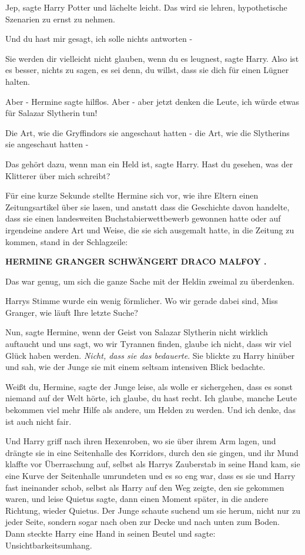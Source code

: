 \glqq{}Jep\grqq{}, sagte Harry Potter und lächelte leicht. \glqq{}Das wird sie
lehren, hypothetische Szenarien zu ernst zu nehmen.\grqq{}

\glqq{}Und du hast mir gesagt, ich solle nichts antworten -\grqq{}

\glqq{}Sie werden dir vielleicht nicht glauben, wenn du es leugnest\grqq{}, sagte
Harry. \glqq{}Also ist es besser, nichts zu sagen, es sei denn, du willst, dass
sie dich für einen Lügner halten.\grqq{}

\glqq{}Aber -\grqq{} Hermine sagte hilflos. \glqq{}Aber - aber jetzt denken die
Leute, ich würde etwas für Salazar Slytherin tun!\grqq{}

Die Art, wie die Gryffindors sie angeschaut hatten - die Art, wie die Slytherins
sie angeschaut hatten -

\glqq{}Das gehört dazu, wenn man ein Held ist\grqq{}, sagte Harry. \glqq{}Hast du
gesehen, was der Klitterer über mich schreibt?\grqq{}

Für eine kurze Sekunde stellte Hermine sich vor, wie ihre Eltern einen
Zeitungsartikel über sie lasen, und anstatt dass die Geschichte davon handelte,
dass sie einen landesweiten Buchstabierwettbewerb gewonnen hatte oder auf
irgendeine andere Art und Weise, die sie sich ausgemalt hatte, in die Zeitung zu
kommen, stand in der Schlagzeile:

\textbf{\glqq{}HERMINE GRANGER
SCHWÄNGERT DRACO MALFOY \glqq{}.}

Das war genug, um sich die ganze Sache mit der Heldin zweimal zu überdenken.

Harrys Stimme wurde ein wenig förmlicher. \glqq{}Wo wir gerade dabei sind, Miss
Granger, wie läuft Ihre letzte Suche?\grqq{}

\glqq{}Nun\grqq{}, sagte Hermine, \glqq{}wenn der Geist von Salazar Slytherin
nicht wirklich auftaucht und uns sagt, wo wir Tyrannen finden, glaube ich nicht,
dass wir viel Glück haben werden.\grqq{} \emph{Nicht, dass sie das bedauerte}.
Sie blickte zu Harry hinüber und sah, wie der Junge sie mit einem seltsam
intensiven Blick bedachte.

\glqq{}Weißt du, Hermine\grqq{}, sagte der Junge leise, als wolle er sichergehen,
dass es sonst niemand auf der Welt hörte, \glqq{}ich glaube, du hast recht. Ich
glaube, manche Leute bekommen viel mehr Hilfe als andere, um Helden zu werden.
Und ich denke, das ist auch nicht fair.\grqq{}

Und Harry griff nach ihren Hexenroben, wo sie über ihrem Arm lagen, und drängte
sie in eine Seitenhalle des Korridors, durch den sie gingen, und ihr Mund
klaffte vor Überraschung auf, selbst als Harrys Zauberstab in seine Hand kam,
sie eine Kurve der Seitenhalle umrundeten und es so eng war, dass es sie und
Harry fast ineinander schob, selbst als Harry auf den Weg zeigte, den sie
gekommen waren, und leise \glqq{}Quietus\grqq{} sagte, dann einen Moment später,
in die andere Richtung, wieder \glqq{}Quietus\grqq{}. Der Junge schaute suchend
um sie herum, nicht nur zu jeder Seite, sondern sogar nach oben zur Decke und
nach unten zum Boden. Dann steckte Harry eine Hand in seinen Beutel und sagte:
\glqq{}Unsichtbarkeitsumhang.\grqq{}

